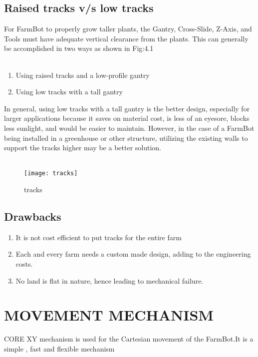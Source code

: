 \documentclass[12pt,a4paper]{report}
\begin{document}
\begin{enumerate}
\section{Raised tracks v/s low tracks} 
\hspace*{1cm}For FarmBot to properly grow taller plants, the Gantry, Cross-Slide, Z-Axis, and Tools must have adequate vertical clearance from the plants. This can generally be accomplished in two ways as shown in Fig:4.1\\\	
\begin{enumerate}
\item 	Using raised tracks and a low-profile gantry
\item	Using low tracks with a tall gantry
 \end{enumerate}
 \hspace*{1cm}
 In general, using low tracks with a tall gantry is the better design, especially for larger applications because it saves on material cost, is less of an eyesore, blocks less sunlight, and would be easier to maintain. However, in the case of a FarmBot being installed in a greenhouse or other structure, utilizing the existing walls to support the tracks higher may be a better solution.\\\ 
  \end{enumerate}
\begin{figure}[h!]
\centering
\texttt{[image: tracks]}
\caption{tracks}
\label{circuit}
\end{figure}
\section{Drawbacks}
\begin{enumerate}
\item	It is not cost efficient to put tracks for the entire farm
\item	Each and every farm needs a custom made design, adding to the engineering
costs.
\item 	No land is flat in nature, hence leading to mechanical failure.
 \end{enumerate}
\newpage
\chapter{MOVEMENT  MECHANISM}
 \hspace*{1cm}CORE XY mechanism is used for the Cartesian movement of the FarmBot.It is a simple , fast and flexible mechanism\\\
\end{document}
